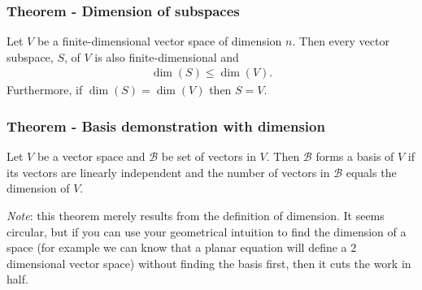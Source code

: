 \documentclass[usenames,dvipsnames,aspectratio=169,10pt]{beamer}
\numberwithin{equation}{section}
\begin{document}
\begin{frame}
\frametitle{Theorem - Dimension of subspaces}
Let $V$ be a finite-dimensional vector space of dimension $n$. Then every vector subspace, $S$, of $V$ is also finite-dimensional and
\begin{align*}
\dim(S) \leq \dim(V).
\end{align*}
Furthermore, if $\dim(S)=\dim(V)$ then $S=V$.
\end{frame}



\begin{frame}
\frametitle{Theorem - Basis demonstration with dimension}

Let $V$ be a vector space and $\mathcal{B}$ be set of vectors in $V$. Then $\mathcal{B}$ forms a basis of $V$ if its vectors are linearly independent and the number of vectors in $\mathcal{B}$ equals the dimension of $V$.

\vspace{1cm}

\textit{Note}: this theorem merely results from the definition of dimension. It seems circular, but if you can use your geometrical intuition to find the dimension of a space (for example we can know that a planar equation will define a 2 dimensional vector space) without finding the basis first, then it cuts the work in half.

\end{frame}
\end{document}

